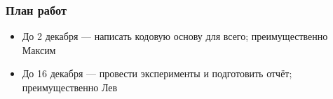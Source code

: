 \documentclass{beamer}
\begin{document}
    \begin{frame}
        \frametitle{План работ}
        \begin{itemize}
            \item До 2 декабря --- написать кодовую основу для всего; преимущественно Максим
            \item До 16 декабря --- провести эксперименты и подготовить отчёт; преимущественно Лев
        \end{itemize}
    \end{frame}
\end{document}
